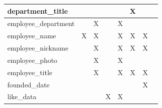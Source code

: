\documentclass[11pt]{report}
\begin{document}
\begin{table}[h]
{\begin{tabular}{|l|c|cccccc}
department\_title                    &             & \multicolumn{1}{c|}{}                 & \multicolumn{1}{c|}{}              & \multicolumn{1}{c|}{}            & \multicolumn{1}{c|}{X}                      & \multicolumn{1}{c|}{}                      & \multicolumn{1}{c|}{}                      \\ \hline
employee\_department                 &             & \multicolumn{1}{c|}{X}                & \multicolumn{1}{c|}{}              & \multicolumn{1}{c|}{X}           & \multicolumn{1}{c|}{}                       & \multicolumn{1}{c|}{}                      & \multicolumn{1}{c|}{}                      \\ \hline
employee\_name                       & X           & \multicolumn{1}{c|}{X}                & \multicolumn{1}{c|}{}              & \multicolumn{1}{c|}{X}           & \multicolumn{1}{c|}{X}                      & \multicolumn{1}{c|}{X}                     & \multicolumn{1}{c|}{}                      \\ \hline
employee\_nickname                   &             & \multicolumn{1}{c|}{X}                & \multicolumn{1}{c|}{}              & \multicolumn{1}{c|}{X}           & \multicolumn{1}{c|}{X}                      & \multicolumn{1}{c|}{X}                     & \multicolumn{1}{c|}{}                      \\ \hline
employee\_photo                      &             & \multicolumn{1}{c|}{X}                & \multicolumn{1}{c|}{}              & \multicolumn{1}{c|}{X}           & \multicolumn{1}{c|}{}                       & \multicolumn{1}{c|}{}                      & \multicolumn{1}{c|}{}                      \\ \hline
employee\_title                      &             & \multicolumn{1}{c|}{X}                & \multicolumn{1}{c|}{}              & \multicolumn{1}{c|}{X}           & \multicolumn{1}{c|}{X}                      & \multicolumn{1}{c|}{X}                     & \multicolumn{1}{c|}{}                      \\ \hline
founded\_date                        &             & \multicolumn{1}{c|}{}                 & \multicolumn{1}{c|}{}              & \multicolumn{1}{c|}{}            & \multicolumn{1}{c|}{}                       & \multicolumn{1}{c|}{X}                     & \multicolumn{1}{c|}{}                      \\ \hline
like\_data                           &             & \multicolumn{1}{c|}{}                 & \multicolumn{1}{c|}{X}             & \multicolumn{1}{c|}{X}           & \multicolumn{1}{c|}{}                       & \multicolumn{1}{c|}{}                      & \multicolumn{1}{c|}{}                      \\ \hline

\end{tabular}}
\end{table}
\end{document}
